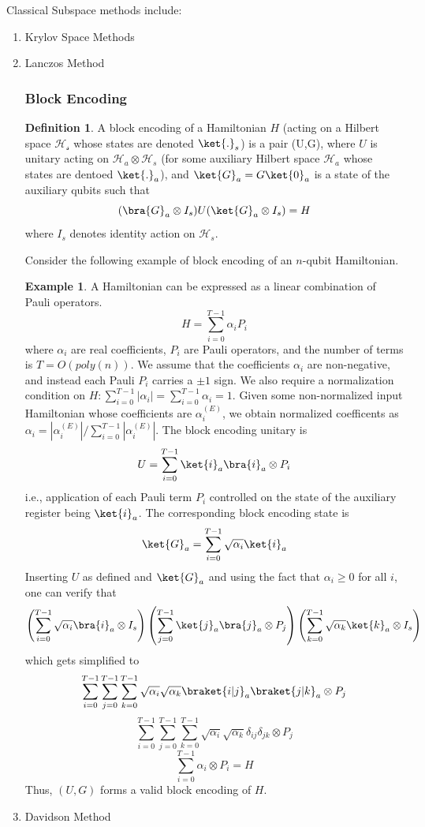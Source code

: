 \documentclass[12pt, oneside]{book}
\theoremstyle{definition}
\newtheorem{definition}{Definition}[section]
\theoremstyle{definition}
\newtheorem{example}{Example}[section]
\theoremstyle{remark}
\begin{document}
Classical Subspace methods include:
\begin{enumerate}
    \item Krylov Space Methods
    \item Lanczos Method
    \subsubsection{Block Encoding}
    \begin{definition}
        A block encoding of a Hamiltonian $H$ (acting on a Hilbert space $\mathcal{H_s}$ whose states are denoted $\ket{.}_s$) is a pair (U,G), where $U$ is unitary acting on $\mathcal{H}_a \otimes \mathcal{H}_s$ (for some auxiliary Hilbert space $\mathcal{H}_a$ whose states are dentoed $\ket{.}_a$), and $\ket{G}_a=G\ket{0}_a $ is a state of the auxiliary qubits such that
        \[
        (\bra{G}_a \otimes I_s)U(\ket{G}_a\otimes I_s)=H
        \]
        where $I_s$ denotes identity action on $\mathcal{H}_s$.
    \end{definition}
    Consider the following example of block encoding of an $n$-qubit Hamiltonian.
    \begin{example}
        A Hamiltonian can be expressed as a linear combination of Pauli operators.
        \[
        H=\sum_{i=0}^{T-1} \alpha_iP_i
        \]
        where $\alpha_i$ are real coefficients, $P_i$ are Pauli operators, and the number of terms is $T=O(poly(n))$. We assume that the coefficients $\alpha_i$ are non-negative, and instead each Pauli $P_i$ carries a $\pm 1$ sign. We also require a normalization condition on $H: \sum_{i=0}^{T-1}|\alpha_i|=\sum_{i=0}^{T-1}\alpha_i=1$. Given some non-normalized input Hamiltonian whose coefficients are $\alpha_i^{(E)}$, we obtain normalized coefficents as $\alpha_i=|\alpha_i^{(E)}|/\sum_{i=0}^{T-1}|\alpha_i^{(E)}|$.
        The block encoding unitary is
        \[
        U=\sum_{i=0}^{T-1} \ket{i}_a\bra{i}_a\otimes P_i
        \]
        i.e., application of each Pauli term $P_i$ controlled on the state of the auxiliary register being $\ket{i}_a$. The corresponding block encoding state is
        \[
        \ket{G}_a=\sum_{i=0}^{T-1}\sqrt{\alpha_i}\ket{i}_a
        \]
        Inserting $U$ as defined and $\ket{G}_a$ and using the fact that $\alpha_i\geq 0$ for all $i$, one can verify that
        \[
        \left(\sum_{i=0}^{T-1} \sqrt{\alpha_i}\bra{i}_a \otimes I_s\right)\left(\sum_{j=0}^{T-1}\ket{j}_a \bra{j}_a\otimes P_j\right)\left(\sum_{k=0}^{T-1} \sqrt{\alpha_k}\ket{k}_a \otimes I_s\right)
        \]
        which gets simplified to
        \[
        \sum_{i=0}^{T-1}\sum_{j=0}^{T-1}\sum_{k=0}^{T-1}  \sqrt{\alpha_i}\sqrt{\alpha_k} \braket{i|j}_a\braket{j|k}_a \otimes P_j
        \]
        \[
        \sum_{i=0}^{T-1}\sum_{j=0}^{T-1}\sum_{k=0}^{T-1}  \sqrt{\alpha_i}\sqrt{\alpha_k} \delta_{ij}\delta_{jk} \otimes P_j
        \]
        \[
        \sum_{i=0}^{T-1} \alpha_i \otimes P_i = H
        \]
        Thus, $(U,G)$ forms a valid block encoding of $H$.
    \end{example}
    \item Davidson Method
\end{enumerate}
\end{document}
